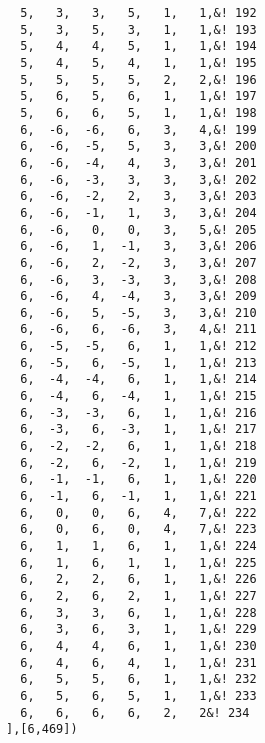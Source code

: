 \begin{Verbatim}
  5,   3,   3,   5,   1,   1,&! 192
  5,   3,   5,   3,   1,   1,&! 193
  5,   4,   4,   5,   1,   1,&! 194
  5,   4,   5,   4,   1,   1,&! 195
  5,   5,   5,   5,   2,   2,&! 196
  5,   6,   5,   6,   1,   1,&! 197
  5,   6,   6,   5,   1,   1,&! 198
  6,  -6,  -6,   6,   3,   4,&! 199
  6,  -6,  -5,   5,   3,   3,&! 200
  6,  -6,  -4,   4,   3,   3,&! 201
  6,  -6,  -3,   3,   3,   3,&! 202
  6,  -6,  -2,   2,   3,   3,&! 203
  6,  -6,  -1,   1,   3,   3,&! 204
  6,  -6,   0,   0,   3,   5,&! 205
  6,  -6,   1,  -1,   3,   3,&! 206
  6,  -6,   2,  -2,   3,   3,&! 207
  6,  -6,   3,  -3,   3,   3,&! 208
  6,  -6,   4,  -4,   3,   3,&! 209
  6,  -6,   5,  -5,   3,   3,&! 210
  6,  -6,   6,  -6,   3,   4,&! 211
  6,  -5,  -5,   6,   1,   1,&! 212
  6,  -5,   6,  -5,   1,   1,&! 213
  6,  -4,  -4,   6,   1,   1,&! 214
  6,  -4,   6,  -4,   1,   1,&! 215
  6,  -3,  -3,   6,   1,   1,&! 216
  6,  -3,   6,  -3,   1,   1,&! 217
  6,  -2,  -2,   6,   1,   1,&! 218
  6,  -2,   6,  -2,   1,   1,&! 219
  6,  -1,  -1,   6,   1,   1,&! 220
  6,  -1,   6,  -1,   1,   1,&! 221
  6,   0,   0,   6,   4,   7,&! 222
  6,   0,   6,   0,   4,   7,&! 223
  6,   1,   1,   6,   1,   1,&! 224
  6,   1,   6,   1,   1,   1,&! 225
  6,   2,   2,   6,   1,   1,&! 226
  6,   2,   6,   2,   1,   1,&! 227
  6,   3,   3,   6,   1,   1,&! 228
  6,   3,   6,   3,   1,   1,&! 229
  6,   4,   4,   6,   1,   1,&! 230
  6,   4,   6,   4,   1,   1,&! 231
  6,   5,   5,   6,   1,   1,&! 232
  6,   5,   6,   5,   1,   1,&! 233
  6,   6,   6,   6,   2,   2&! 234
],[6,469])



\end{Verbatim}
